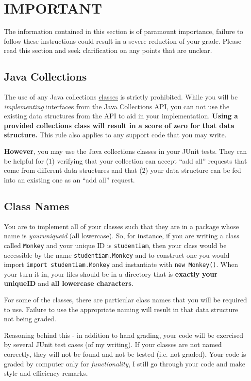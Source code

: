 \documentclass[11pt]{exam}
\begin{document}
\section*{IMPORTANT}
The information contained in this section is of paramount importance, failure to follow these instructions could result in a severe  reduction of your grade.   Please read this section and seek clarification on any points that are unclear.

\subsection*{Java Collections}
The use of any Java collections \underline{classes} is strictly prohibited.   While you will be {\it implementing} interfaces from the Java Collections API, you can not use the existing data structures from the API to aid in your implementation.  {\bf Using a provided collections class will result in a score of zero for that data structure.}  This rule also applies to any support code that you may write.
\par
{\bf However}, you may use the Java collections classes in your JUnit tests.  They can be helpful for (1) verifying that your collection can accept ``add all'' requests that come from different data structures and that (2) your data structure can be fed into an existing one as an ``add all'' request.

\subsection*{Class Names}
You are to implement all of your classes such that they are in a package whose name is {\it youruniqueid} (all lowercase).  So, for instance, if you are writing a class called {\tt Monkey} and your unique ID is {\tt studentiam}, then your class would be accessible by the name {\tt studentiam.Monkey} and to construct one you would import {\tt import studentiam.Monkey} and instantiate with {\tt new Monkey()}.  When your turn it in, your files should be in a directory that is {\bf exactly your uniqueID} and {\bf all lowercase characters}.
\par
For some of the classes, there are particular class names that you will be required to use.   Failure to use the appropriate naming will result in that data structure not being graded.
\par
Reasoning behind this - in addition to hand grading, your code will be exercised by several JUnit test cases (of my writing).   If your classes are not named correctly, they will not be found and not be tested (i.e. not graded).  Your code is graded by computer only for {\it functionality}, I still go through your code and make style and efficiency remarks.
\end{document}

